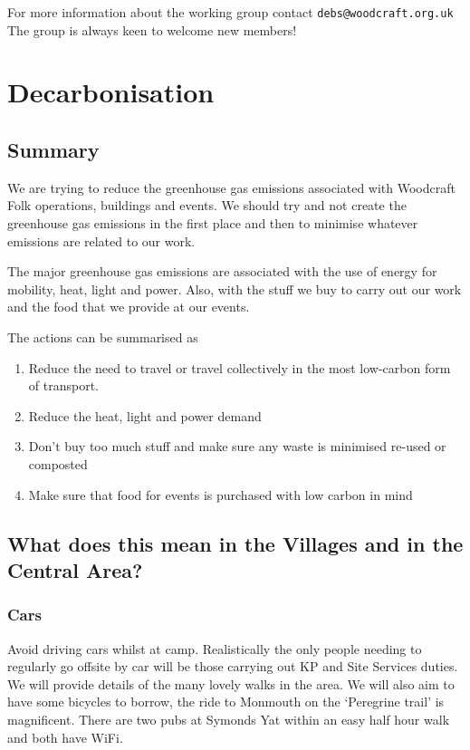 \documentclass[a4paper, 11pt]{report}
\begin{document}
For more information about the working group contact \texttt{debs@woodcraft.org.uk} The group is always keen to welcome new members!

\chapter{Decarbonisation}
\section{Summary}
We are trying to reduce the greenhouse gas emissions associated with Woodcraft Folk operations, buildings and events. We should try and not create the greenhouse gas emissions in the first place and then to minimise whatever emissions are related to our work.\nl

The major greenhouse gas emissions are associated with the use of energy for mobility, heat, light and power. Also, with the stuff we buy to carry out our work and the food that we provide at our events.\nl

The actions can be summarised as
\begin{enumerate}
    \item Reduce the need to travel or travel collectively in the most low-carbon form of transport.
    \item Reduce the heat, light and power demand
    \item Don't buy too much stuff and make sure any waste is minimised re-used or composted
    \item Make sure that food for events is purchased with low carbon in mind
\end{enumerate}

\section{What does this mean in the Villages and in the Central Area?}
\subsection{Cars}
Avoid driving cars whilst at camp. Realistically the only people needing to regularly go offsite by car will be those carrying out KP and Site Services duties. We will provide details of the many lovely walks in the area. We will also aim to have some bicycles to borrow, the ride to Monmouth on the `Peregrine trail' is magnificent. There are two pubs at Symonds Yat within an easy half hour walk and both have WiFi.
\end{document}
